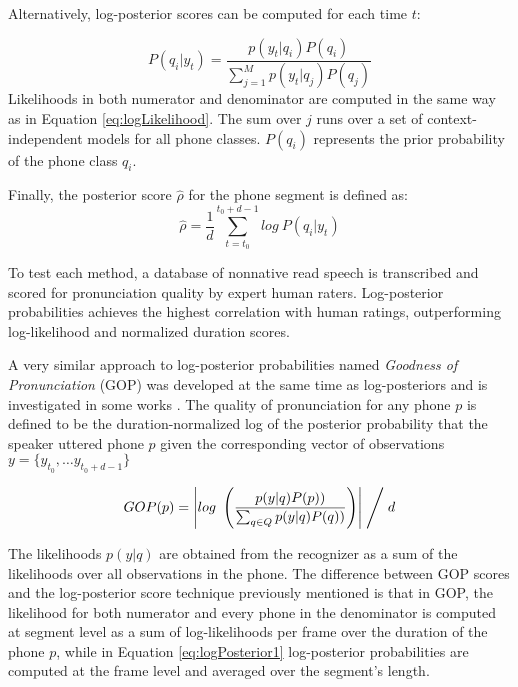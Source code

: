 Alternatively, log-posterior scores can be computed for each time $t$:

\begin{equation}
\label{eq:logPosterior1}
P(q_{i}|y_{t}) = \frac{p(y_{t}|q_{i})P(q_{i})}{\sum\limits_{j=1}^{M} p(y_{t}|q_{j})P(q_{j})}
\end{equation}
Likelihoods in both numerator and denominator are computed in the same way as in 
Equation \ref{eq:logLikelihood}. 
The sum over $j$ runs over a set of context-independent models for all phone classes. $P(q_{i})$
represents the prior probability of the phone class $q_{i}$. 

Finally, the posterior score $\hat{\rho}$ for the phone segment is defined as:
\begin{equation}
\label{eq:logPosterior2}
\hat{\rho} = \frac{1}{d}\sum_{t=t_{0}}^{t_{0}+d-1} log \ P(q_{i}|y_{t})
\end{equation}

To test each method, a database of nonnative read speech is transcribed and scored for 
pronunciation quality by expert human raters. Log-posterior probabilities achieves the
highest correlation with human ratings, outperforming log-likelihood and normalized duration
scores.

A very similar approach to log-posterior probabilities named \textit{Goodness of Pronunciation}
(GOP) was developed at the same time as log-posteriors and
is investigated in some works \cite{gop_1, gop_2, gop_3}. The quality of 
pronunciation for any phone $p$ is defined to be the duration-normalized log of the posterior
probability that the speaker uttered phone $p$ given the corresponding vector of observations
$y=\{y_{t_{0}}, \dotsc y_{t_{0}+d-1} \}$

\begin{equation}
\label{eq:gopScore}
GOP(p) = \left| log \ \left(\frac{p(y|q)P(p))}{\sum_{q \in Q}p(y|q)P(q))}\right) \right| \Biggm/ d 
\end{equation}

The likelihoods $p(y|q)$ are obtained from the recognizer as a sum of the likelihoods over all
observations in the phone.
The difference between GOP scores and the log-posterior score technique previously mentioned 
is that in GOP, the likelihood for both numerator and every phone in the denominator is
computed at segment level as a sum of log-likelihoods per frame over the 
duration of the phone $p$, while in Equation \ref{eq:logPosterior1} log-posterior 
probabilities are computed at the frame level and averaged over the segment's length.

